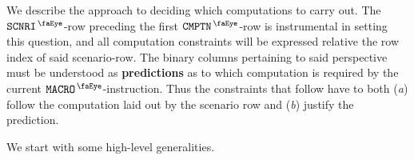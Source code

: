 We describe the approach to deciding which computations to carry out.
The $\isMxpScenario$-row preceding the first $\isMxpComputation$-row is instrumental in setting this question,
and all computation constraints will be expressed relative the row index of said scenario-row.
The binary columns pertaining to said perspective must be understood as \textbf{predictions} as to which computation is required by the current $\isMxpMacro$-instruction.
Thus the constraints that follow have to both
(\emph{a}) follow the computation laid out by the scenario row and
(\emph{b}) justify the prediction.

We start with some high-level generalities.

 \label{mxp: computations: decision tree}

